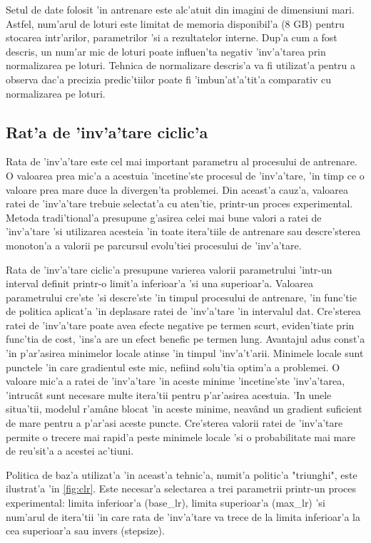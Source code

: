 \documentclass[12pt,a4paper,twoside]{report}
\begin{document}
Setul de date folosit 'in antrenare este alc'atuit din imagini de dimensiuni mari. Astfel, num'arul de loturi este limitat de memoria disponibil'a (8 GB) pentru stocarea intr'arilor, parametrilor 'si a rezultatelor interne. Dup'a cum a fost descris, un num'ar mic de loturi poate influen'ta negativ 'inv'a'tarea prin normalizarea pe loturi. Tehnica de normalizare descris'a va fi utilizat'a pentru a observa dac'a precizia predic'tiilor poate fi 'imbun'at'a'tit'a comparativ cu normalizarea pe loturi.

\subsection{Rat'a de 'inv'a'tare ciclic'a}
Rata de 'inv'a'tare este cel mai important parametru al procesului de antrenare. O valoarea prea mic'a a acestuia 'incetine'ste procesul de 'inv'a'tare, 'in timp ce o valoare prea mare duce la divergen'ta problemei. Din aceast'a cauz'a, valoarea ratei de 'inv'a'tare trebuie selectat'a cu aten'tie, printr-un proces experimental. Metoda tradi'tional'a presupune g'asirea celei mai bune valori a ratei de 'inv'a'tare 'si utilizarea acesteia 'in toate itera'tiile de antrenare sau descre'sterea monoton'a a valorii pe parcursul evolu'tiei procesului de 'inv'a'tare.

Rata de 'inv'a'tare ciclic'a presupune varierea valorii parametrului 'intr-un interval definit printr-o limit'a inferioar'a 'si una superioar'a. Valoarea parametrului cre'ste 'si descre'ste 'in timpul procesului de antrenare,  'in func'tie de politica aplicat'a 'in deplasare ratei de 'inv'a'tare 'in intervalul dat.
Cre'sterea ratei de 'inv'a'tare poate avea efecte negative pe termen scurt, eviden'tiate prin func'tia de cost, 'ins'a are un efect benefic pe termen lung. Avantajul adus const'a 'in p'ar'asirea minimelor locale atinse 'in timpul 'inv'a't'arii. Minimele locale sunt punctele 'in care gradientul este mic, nefiind solu'tia optim'a a problemei. O valoare mic'a a ratei de 'inv'a'tare 'in aceste minime 'incetine'ste 'inv'a'tarea, 'intruc\^at sunt necesare multe itera'tii pentru p'ar'asirea acestuia. 'In unele situa'tii, modelul r'am\^ane blocat 'in aceste minime, neav\^and un gradient suficient de mare pentru a p'ar'asi aceste puncte. Cre'sterea valorii ratei de 'inv'a'tare permite o trecere mai rapid'a peste minimele locale 'si o probabilitate mai mare de reu'sit'a a acestei ac'tiuni.

Politica de baz'a utilizat'a 'in aceast'a tehnic'a, numit'a politic'a "triunghi", este  ilustrat'a 'in \ref{fig:clr}. Este necesar'a selectarea a trei parametrii printr-un proces experimental: limita inferioar'a (base\_lr), limita superioar'a (max\_lr) 'si num'arul de itera'tii 'in care rata de 'inv'a'tare va trece de la limita inferioar'a la cea superioar'a sau invers (stepsize).
\end{document}
